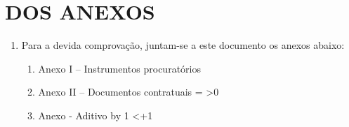 \section{DOS ANEXOS}

\begin{enumerate}[resume]
\item Para a devida comprovação, juntam-se a este documento os anexos abaixo:
  \begin{enumerate}
    \item Anexo I – Instrumentos procuratórios
    \item Anexo II – Documentos contratuais
    \newcount\totalAditivos
    \ifdefined\quantidadeAditivos
      \totalAditivos=\quantidadeAditivos\relax
    \else
      \ifdefined\possuiAditivos
        \ifnum{}
        \fi
      \fi
    \fi
    \ifnum\totalAditivos>0
      \newcount\indiceAditivo
      \loop
        \item Anexo  - Aditivo \number\indiceAditivo
        \advance\indiceAditivo by 1
      \ifnum\indiceAditivo<\numexpr\totalAditivos+1\relax
      \repeat
    \fi
  \end{enumerate}
\end{enumerate}